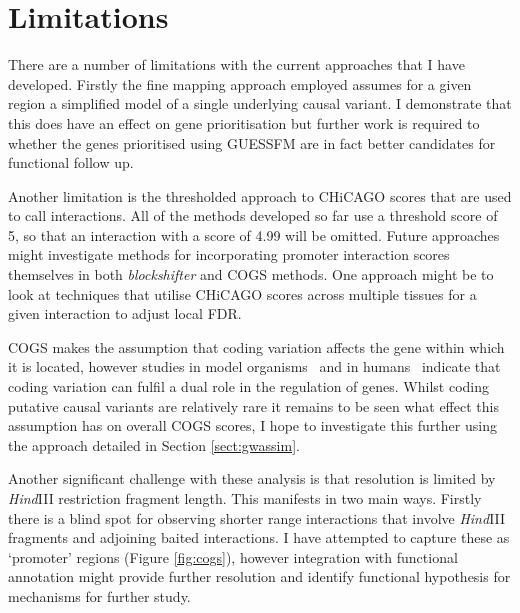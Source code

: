 \documentclass[a4paper,11pt]{report}
\begin{document}
\section{Limitations}
There are a number of limitations with the current approaches that I have developed. Firstly the fine mapping approach employed assumes for a given region a simplified model of a single underlying causal variant. I demonstrate that this does have an effect on gene prioritisation but further work is required to whether the genes prioritised using GUESSFM are in fact better candidates for functional follow up.

Another limitation is the thresholded approach to CHiCAGO scores that are used to call interactions. All of the methods developed so far use a threshold score of 5, so that an interaction with a score of 4.99 will be omitted. Future approaches might investigate methods for incorporating promoter interaction scores themselves in both \textit{blockshifter} and COGS methods. One approach might be to look at techniques that utilise CHiCAGO scores across multiple tissues for a given interaction to adjust local FDR. 

COGS makes the assumption that coding variation affects the gene within which it is located, however studies in model organisms~\citep{LawrieMesserHershbergEtAl2013} and in humans~\citep{StergachisHaugenShaferEtAl2013} indicate that coding variation can fulfil a dual role in the regulation of genes. Whilst coding putative causal variants are relatively rare it remains to be seen what effect this assumption has on overall COGS scores, I hope to investigate this further using the approach detailed in Section \ref{sect:gwassim}.

Another significant challenge with these analysis is that resolution is limited by \textit{Hind}III restriction fragment length. This manifests in two main ways. Firstly there is a blind spot for observing shorter range interactions that involve \textit{Hind}III fragments and adjoining baited interactions. I have attempted to capture these as `promoter' regions (Figure \ref{fig:cogs}), however integration with functional annotation might provide further resolution and identify functional hypothesis for mechanisms for further study. 
\end{document}
